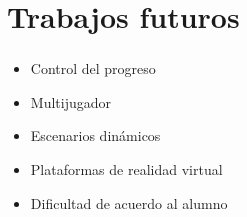 \section{Trabajos futuros}
\setcounter{sectiontotal}{1}

\begin{frame}
\frametitle{\pagetitle}
\begin{itemize}[<+->]
    \item Control del progreso
    \item Multijugador
    \item Escenarios dinámicos
    \item Plataformas de realidad virtual
    \item Dificultad de acuerdo al alumno
\end{itemize}
\end{frame}

